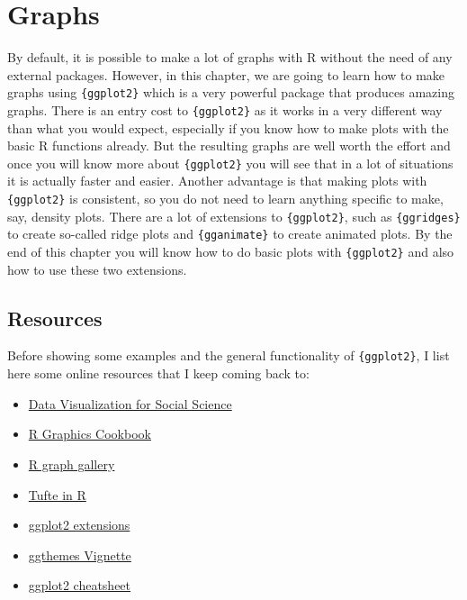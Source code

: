 \documentclass[
]{article}
\begin{document}
\hypertarget{graphs}{%
\section{Graphs}\label{graphs}}

By default, it is possible to make a lot of graphs with R without the need of any external
packages. However, in this chapter, we are going to learn how to make graphs using \texttt{\{ggplot2\}} which
is a very powerful package that produces amazing graphs. There is an entry cost to \texttt{\{ggplot2\}} as it
works in a very different way than what you would expect, especially if you know how to make plots
with the basic R functions already. But the resulting graphs are well worth the effort and once
you will know more about \texttt{\{ggplot2\}} you will see that in a lot of situations it is actually faster
and easier. Another advantage is that making plots with \texttt{\{ggplot2\}} is consistent, so you do not need
to learn anything specific to make, say, density plots. There are a lot of extensions to \texttt{\{ggplot2\}},
such as \texttt{\{ggridges\}} to create so-called ridge plots and \texttt{\{gganimate\}} to create animated plots. By
the end of this chapter you will know how to do basic plots with \texttt{\{ggplot2\}} and also how to use these
two extensions.

\hypertarget{resources}{%
\subsection{Resources}\label{resources}}

Before showing some examples and the general functionality of \texttt{\{ggplot2\}}, I list here some online
resources that I keep coming back to:

\begin{itemize}
\item
  \href{http://socviz.co/}{Data Visualization for Social Science}
\item
  \href{http://www.cookbook-r.com/Graphs/}{R Graphics Cookbook}
\item
  \href{http://www.r-graph-gallery.com/portfolio/ggplot2-package/}{R graph gallery}
\item
  \href{http://motioninsocial.com/tufte/}{Tufte in R}
\item
  \href{https://exts.ggplot2.tidyverse.org/}{ggplot2 extensions}
\item
  \href{https://cran.r-project.org/web/packages/ggthemes/vignettes/ggthemes.html}{ggthemes Vignette}
\item
  \href{https://www.rstudio.com/wp-content/uploads/2015/03/ggplot2-cheatsheet.pdf}{ggplot2 cheatsheet}
\end{itemize}
\end{document}
